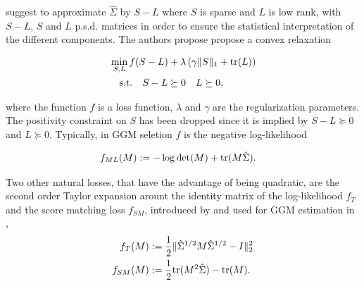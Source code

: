 \documentclass[letterpaper]{article}
\begin{document}
\citet{chandrasekaran2010} suggest to approximate $\hat{\Sigma}$  by $S-L$ where $S$ is sparse and $L$ is low rank, with $S-L$, $S$ and $L$ p.s.d. matrices in order to ensure the statistical interpretation of the different components. The authors propose propose a convex relaxation 

\begin{align}
\label{opt_tr}
&\min_{S,L} f(S-L)+\lambda\left(\gamma\|S\|_{1}+ {\rm tr}(L)\right) \\
&\quad \text{s.t.} \quad S-L \succeq 0 \quad L \succeq 0, \nonumber
\end{align}

where the function $f$ is a loss function, $\lambda$ and $\gamma$ are the regularization parameters. The positivity constraint on $S$ has been dropped since it is implied by $S-L \succeq 0$ and $L \succeq 0$. Typically, in GGM seletion $f$ is the negative log-likelihood

\begin{align}
f_{ML}(M)&:=-\log\det(M) + {\rm tr}(M\hat{\Sigma}).
\end{align}

 
Two other natural losses, that have the advantage of being quadratic, are the second order Taylor expansion arount the identity matrix of the log-likelihood $f_{T}$ and the score matching loss $f_{SM}$, introduced by \citet{hyvarinen2005estimation} and used for GGM estimation in \citet{lin2016estimation},
\begin{align}
f_{T}(M)&:=\frac{1}{2}\|\hat{\Sigma}^{1/2}M\hat{\Sigma}^{1/2}-I\|_2^2\\
f_{SM}(M)&:=\frac{1}{2}{\rm tr}(M^2 \hat{\Sigma})-{\rm tr}(M).
\end{align}
\end{document}
